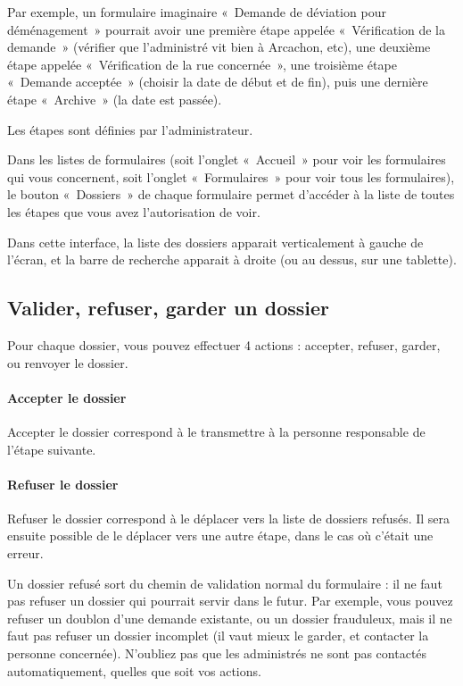 \documentclass[11pt,french]{memoir}
\begin{document}
	Par exemple, un formulaire imaginaire «~Demande de déviation pour déménagement~» pourrait avoir une première étape appelée «~Vérification de la demande~» (vérifier que l'administré vit bien à Arcachon, etc), une deuxième étape appelée «~Vérification de la rue concernée~», une troisième étape «~Demande acceptée~» (choisir la date de début et de fin), puis une dernière étape «~Archive~» (la date est passée).

	Les étapes sont définies par l'administrateur.

	\uparagraph
	Dans les listes de formulaires (soit l'onglet «~Accueil~» pour voir les formulaires qui vous concernent, soit l'onglet «~Formulaires~» pour voir tous les formulaires), le bouton «~Dossiers~» de chaque formulaire permet d'accéder à la liste de toutes les étapes que vous avez l'autorisation de voir.

	Dans cette interface, la liste des dossiers apparait verticalement à gauche de l'écran, et la barre de recherche apparait à droite (ou au dessus, sur une tablette).

	\subsection{Valider, refuser, garder un dossier}\label{subsec:valider-refuser-garder-un-dossier}

	Pour chaque dossier, vous pouvez effectuer 4 actions : accepter, refuser, garder, ou renvoyer le dossier.

	\paragraph{Accepter le dossier}
	Accepter le dossier correspond à le transmettre à la personne responsable de l'étape suivante.

	\paragraph{Refuser le dossier}
	Refuser le dossier correspond à le déplacer vers la liste de dossiers refusés.
	Il sera ensuite possible de le déplacer vers une autre étape, dans le cas où c'était une erreur.

	Un dossier refusé sort du chemin de validation normal du formulaire : il ne faut pas refuser un dossier qui pourrait servir dans le futur.
	Par exemple, vous pouvez refuser un doublon d'une demande existante, ou un dossier frauduleux, mais il ne faut pas refuser un dossier incomplet (il vaut mieux le garder, et contacter la personne concernée).
	N'oubliez pas que les administrés ne sont pas contactés automatiquement, quelles que soit vos actions.
\end{document}

